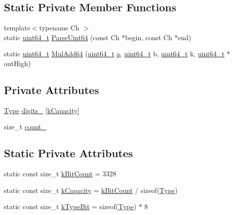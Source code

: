 \subsection*{Static Private Member Functions}
\begin{DoxyCompactItemize}
\item 
{\footnotesize template$<$typename Ch $>$ }\\static \hyperlink{stdint_8h_aec6fcb673ff035718c238c8c9d544c47}{uint64\+\_\+t} \hyperlink{classinternal_1_1BigInteger_acebb94526a2f5f26f0de244b7f76a3db}{Parse\+Uint64} (const Ch $\ast$begin, const Ch $\ast$end)
\item 
static \hyperlink{stdint_8h_aec6fcb673ff035718c238c8c9d544c47}{uint64\+\_\+t} \hyperlink{classinternal_1_1BigInteger_a3857418321694cd20071203b2f08ebfe}{Mul\+Add64} (\hyperlink{stdint_8h_aec6fcb673ff035718c238c8c9d544c47}{uint64\+\_\+t} \hyperlink{pointer_8h_aeeddce917cf130d62c370b8f216026dd}{a}, \hyperlink{stdint_8h_aec6fcb673ff035718c238c8c9d544c47}{uint64\+\_\+t} b, \hyperlink{stdint_8h_aec6fcb673ff035718c238c8c9d544c47}{uint64\+\_\+t} k, \hyperlink{stdint_8h_aec6fcb673ff035718c238c8c9d544c47}{uint64\+\_\+t} $\ast$out\+High)
\end{DoxyCompactItemize}
\subsection*{Private Attributes}
\begin{DoxyCompactItemize}
\item 
\hyperlink{classinternal_1_1BigInteger_a1310812fca26ebae77594ba08678fc4c}{Type} \hyperlink{classinternal_1_1BigInteger_a0b505df38fedd862a748fe1e629d918a}{digits\+\_\+} \mbox{[}\hyperlink{classinternal_1_1BigInteger_a8a908718d685b9bd39fb52f2e511b0c6}{k\+Capacity}\mbox{]}
\item 
size\+\_\+t \hyperlink{classinternal_1_1BigInteger_ad4bf5198afe86d754ec57a82605e644b}{count\+\_\+}
\end{DoxyCompactItemize}
\subsection*{Static Private Attributes}
\begin{DoxyCompactItemize}
\item 
static const size\+\_\+t \hyperlink{classinternal_1_1BigInteger_a89d6a00e78a914d0b873784539416dc5}{k\+Bit\+Count} = 3328
\item 
static const size\+\_\+t \hyperlink{classinternal_1_1BigInteger_a8a908718d685b9bd39fb52f2e511b0c6}{k\+Capacity} = \hyperlink{classinternal_1_1BigInteger_a89d6a00e78a914d0b873784539416dc5}{k\+Bit\+Count} / sizeof(\hyperlink{classinternal_1_1BigInteger_a1310812fca26ebae77594ba08678fc4c}{Type})
\item 
static const size\+\_\+t \hyperlink{classinternal_1_1BigInteger_a662666ad4bc9122cb80ba2ac6e88a745}{k\+Type\+Bit} = sizeof(\hyperlink{classinternal_1_1BigInteger_a1310812fca26ebae77594ba08678fc4c}{Type}) $\ast$ 8
\end{DoxyCompactItemize}


